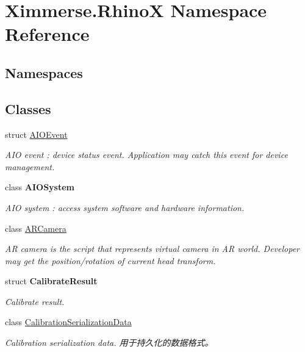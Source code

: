 \hypertarget{namespace_ximmerse_1_1_rhino_x}{}\section{Ximmerse.\+RhinoX Namespace Reference}
\label{namespace_ximmerse_1_1_rhino_x}
\subsection*{Namespaces}
\begin{DoxyCompactItemize}
\end{DoxyCompactItemize}
\subsection*{Classes}
\begin{DoxyCompactItemize}
\item 
struct \mbox{\hyperlink{struct_ximmerse_1_1_rhino_x_1_1_a_i_o_event}{A\+I\+O\+Event}}
\begin{DoxyCompactList}\small\item\em A\+IO event \+: device status event. Application may catch this event for device management. \end{DoxyCompactList}\item 
class {\bfseries A\+I\+O\+System}
\begin{DoxyCompactList}\small\item\em A\+IO system \+: access system software and hardware information. \end{DoxyCompactList}\item 
class \mbox{\hyperlink{class_ximmerse_1_1_rhino_x_1_1_a_r_camera}{A\+R\+Camera}}
\begin{DoxyCompactList}\small\item\em AR camera is the script that represents virtual camera in AR world. Developer may get the position/rotation of current head transform. \end{DoxyCompactList}\item 
struct {\bfseries Calibrate\+Result}
\begin{DoxyCompactList}\small\item\em Calibrate result. \end{DoxyCompactList}\item 
class \mbox{\hyperlink{class_ximmerse_1_1_rhino_x_1_1_calibration_serialization_data}{Calibration\+Serialization\+Data}}
\begin{DoxyCompactList}\small\item\em Calibration serialization data. 用于持久化的数据格式。 \end{DoxyCompactList}\item 

\end{DoxyCompactItemize}
